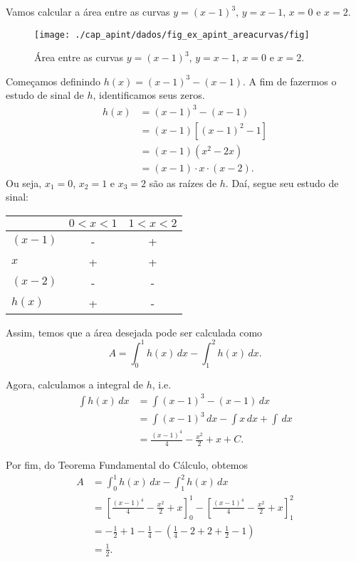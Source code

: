 \begin{ex}\label{ex:apint_areacurvas}
  Vamos calcular a área entre as curvas $y = (x-1)^3$, $y = x-1$, $x=0$ e $x=2$.

  \begin{figure}[H]
    \centering
    \texttt{[image: ./cap\_apint/dados/fig\_ex\_apint\_areacurvas/fig]}
    \caption{Área entre as curvas $y = (x-1)^3$, $y = x-1$, $x=0$ e $x=2$.}
    \label{fig:ex_apint_areacurvas}
  \end{figure}  

  Começamos definindo $h(x) = (x-1)^3 - (x-1)$. A fim de fazermos o estudo de sinal de $h$, identificamos seus zeros.
  \begin{align}
    h(x) &= (x-1)^3-(x-1) \\
         &= (x-1)\left[(x-1)^2-1\right] \\
         &= (x-1)(x^2-2x) \\
         &= (x-1)\cdot x\cdot (x-2).
  \end{align}
  Ou seja, $x_1=0$, $x_2=1$ e $x_3=2$ são as raízes de $h$. Daí, segue seu estudo de sinal:
  \begin{center}
    \begin{tabular}{l|c|c}
              & $0<x<1$ & $1<x<2$ \\\hline
      $(x-1)$ &   -     &    +    \\
      $x$     &   +     &    +    \\
      $(x-2)$ &   -     &    -    \\\hline
      $h(x)$  &   +     &    -    \\\hline
    \end{tabular}
  \end{center}
  Assim, temos que a área desejada pode ser calculada como
  \begin{equation}
    A = \int_0^1 h(x)\,dx - \int_1^2 h(x)\,dx.
  \end{equation}

  Agora, calculamos a integral de $h$, i.e.
  \begin{align}
    \int h(x)\,dx &= \int (x-1)^3-(x-1)\,dx \\
                  &= \int (x-1)^3\,dx - \int x\,dx + \int\,dx \\
                  &= \frac{(x-1)^4}{4} - \frac{x^2}{2} + x + C.
  \end{align}

  Por fim, do Teorema Fundamental do Cálculo, obtemos
  \begin{align}
    A &= \int_0^1 h(x)\,dx - \int_1^2 h(x)\,dx \\
      &= \left[\frac{(x-1)^4}{4} - \frac{x^2}{2} + x\right]_0^1 - \left[\frac{(x-1)^4}{4} - \frac{x^2}{2} + x\right]_1^2 \\
      &= -\frac{1}{2}+1-\frac{1}{4}-\left(\frac{1}{4}-2+2+\frac{1}{2}-1\right) \\
      &= \frac{1}{2}.
  \end{align}
  

\end{ex}

